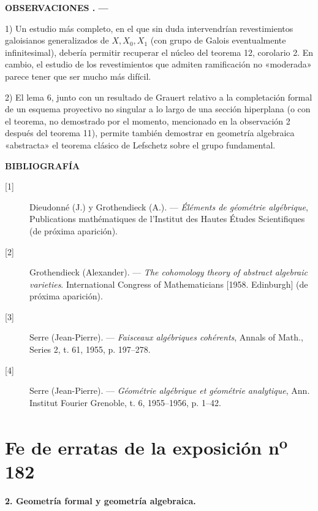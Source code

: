\documentclass[11pt,twoside,openany]{book}
\numberwithin{equation}{section}
\newcommand{\src}[1]{%
  \phantomsection\hypertarget{src:#1}{}%
  \marginpar{\raggedleft\footnotesize\sffamily #1}%
}
\theoremstyle{plain}
\theoremstyle{definition}
\theoremstyle{remark}
\newcommand{\result}[2]{%
  \par\medskip\noindent\textbf{#1%
  \if\relax\detokenize{#2}\relax\else\space#2\fi. ---}\enspace
}
\newcommand{\FgaUnitKey}{frontmatter}
\renewcommand{\src}[1]{%
  \phantomsection\hypertarget{src:\FgaUnitKey:#1}{}%
  \marginpar{\raggedleft\footnotesize\sffamily #1}%
}
\theoremstyle{plain}
\theoremstyle{definition}
\theoremstyle{remark}
\begin{document}
\src{220}
\result{OBSERVACIONES}{}

1) Un estudio más completo, en el que sin duda intervendrían revestimientos
galoisianos generalizados de $X,X_0,X_1$ (con grupo de Galois eventualmente
infinitesimal), debería permitir recuperar el núcleo del teorema 12, corolario
2. En cambio, el estudio de los revestimientos que admiten ramificación no
«moderada» parece tener que ser mucho más difícil.

2) El lema 6, junto con un resultado de Grauert relativo a la completación
formal de un esquema proyectivo no singular a lo largo de una sección
hiperplana (o con el teorema, no demostrado por el momento, mencionado en la
observación 2 después del teorema 11), permite también demostrar en geometría
algebraica «abstracta» el teorema clásico de Lefschetz sobre el grupo
fundamental.

\begin{center}
  \textbf{BIBLIOGRAFÍA}
\end{center}

\begin{description}
  \item[{[1]}] Dieudonné (J.) y Grothendieck (A.). --- \emph{Éléments de
    géométrie algébrique}, Publications mathématiques de l'Institut des Hautes
    Études Scientifiques (de próxima aparición).
  \item[{[2]}] Grothendieck (Alexander). --- \emph{The cohomology theory of
    abstract algebraic varieties}. International Congress of Mathematicians
    [1958. Edinburgh] (de próxima aparición).
  \item[{[3]}] Serre (Jean-Pierre). --- \emph{Faisceaux algébriques
    cohérents}, Annals of Math., Series 2, t. 61, 1955, p. 197--278.
  \item[{[4]}] Serre (Jean-Pierre). --- \emph{Géométrie algébrique et
    géométrie analytique}, Ann. Institut Fourier Grenoble, t. 6, 1955--1956,
    p. 1--42.
\end{description}

\def\FgaUnitKey{e182}\clearpage
\chapter*{Fe de erratas de la exposición n\textsuperscript{o} 182}
\setcounter{footnote}{1}
\src{298}

\noindent\textbf{2. Geometría formal y geometría algebraica.}
\end{document}

